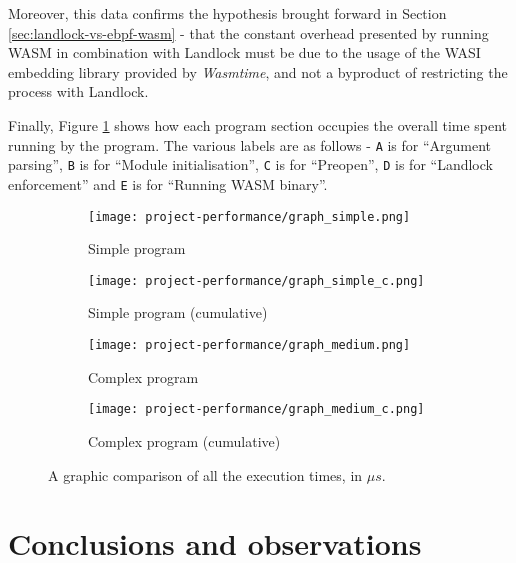 Moreover, this data confirms the hypothesis brought forward in Section \ref{sec:landlock-vs-ebpf-wasm} - that
the constant overhead presented by running WASM in combination with Landlock must be due to the usage of
the WASI embedding library provided by \textit{Wasmtime}, and not a byproduct of restricting the process with Landlock.

Finally, Figure \ref{fig:perf-execution-times-comparison} shows how each program section
occupies the overall time spent running by the program. The various labels are as follows
- \texttt{A} is for ``Argument parsing'', \texttt{B} is for ``Module initialisation'',
\texttt{C} is for ``Preopen'', \texttt{D} is for ``Landlock enforcement'' and
\texttt{E} is for ``Running WASM binary''.

\begin{figure}[ht!]
  \centering
  
  \begin{subfigure}[b]{0.46\textwidth}
    \texttt{[image: project-performance/graph\_simple.png]}
    \caption{Simple program}
  \end{subfigure}
  \begin{subfigure}[b]{0.46\textwidth}
    \texttt{[image: project-performance/graph\_simple\_c.png]}
    \caption{Simple program (cumulative)}
  \end{subfigure}

  \begin{subfigure}[b]{0.46\textwidth}
    \texttt{[image: project-performance/graph\_medium.png]}
    \caption{Complex program}
  \end{subfigure}
  \begin{subfigure}[b]{0.46\textwidth}
    \texttt{[image: project-performance/graph\_medium\_c.png]}
    \caption{Complex program (cumulative)}
  \end{subfigure}

  \caption{A graphic comparison of all the execution times, in $\mu s$.}
  \label{fig:perf-execution-times-comparison}
\end{figure}

\section{Conclusions and observations}